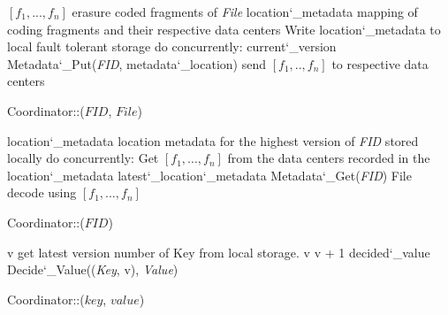 
\begin{algorithm}
  \DontPrintSemicolon
  $[f_1, ..., f_n]$ \LAR erasure coded fragments of {\em File}\;
  location\char`_metadata \LAR mapping of coding fragments and their respective data centers\;
  Write location\char`_metadata to local fault tolerant storage\;
  do concurrently:\;
  current\char`_version \LAR Metadata\char`_Put({\em FID}, metadata\char`_location)\;
  send $[f_1, .., f_n]$ to respective data centers\;
   {
  } 
  \caption{Coordinator::($FID$, $File$) }
  \label{alg:coordinator}
\end{algorithm}

\begin{algorithm}
  \DontPrintSemicolon
  location\char`_metadata \LAR location metadata for the highest version of {\em FID} stored locally\;
  do concurrently:\;
  Get $[f_1, ..., f_n]$ from the data centers recorded in the location\char`_metadata\;
  latest\char`_location\char`_metadata \LAR Metadata\char`_Get({\em FID})\;
   {
    File \LAR decode using $[f_1, ..., f_n]$\;
    \;
  } 
  \caption{Coordinator::($FID$) }
  \label{alg:coordinator}
\end{algorithm}

\begin{algorithm}
  \DontPrintSemicolon
  v \LAR get latest version number of Key from local storage.\;
   { 
     v \LAR v + 1 \;
     decided\char`_value \LAR Decide\char`_Value(({\em Key}, v), {\em Value})
  }
   \;
  \caption{Coordinator::($key$, $value$) }
\end{algorithm}

